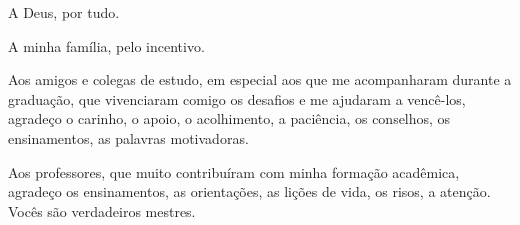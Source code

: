 A Deus, por tudo.

A minha família, pelo incentivo.

Aos amigos e colegas de estudo, em especial aos que me acompanharam durante a graduação, que vivenciaram comigo os desafios e me ajudaram a vencê-los, agradeço o
carinho, o apoio, o acolhimento, a paciência, os conselhos, os ensinamentos, as palavras
motivadoras.

Aos professores, que muito contribuíram com minha formação acadêmica, agradeço os ensinamentos, as orientações, as lições de vida, os risos, a atenção. Vocês são verdadeiros mestres.